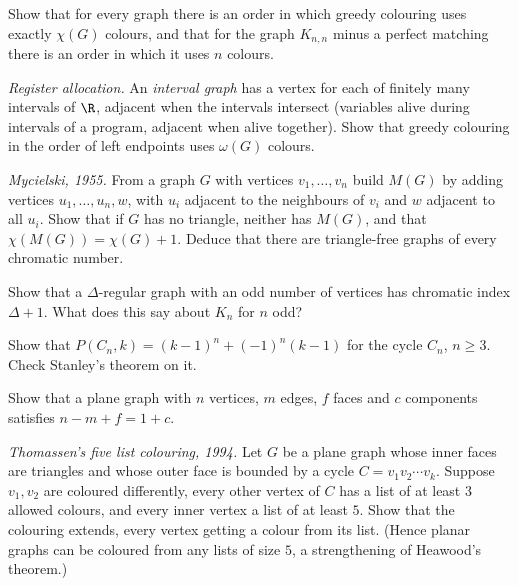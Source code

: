 \begin{exercise}[$\star$]\label{ex:greedyorder}
Show that for every graph there is an order in which greedy colouring uses exactly $\chi(G)$ colours, and that for the graph $K_{n,n}$ minus a perfect matching
there is an order in which it uses $n$ colours.
\end{exercise}

\begin{exercise}[$\star$]\label{ex:interval}
\emph{Register allocation.} An \emph{interval graph} has a vertex for each of finitely many intervals of $\R$, adjacent when the intervals intersect (variables alive
during intervals of a program, adjacent when alive together). Show that greedy colouring in the order of left endpoints uses $\omega(G)$ colours.
\end{exercise}

\begin{exercise}[$\star\star$]\label{ex:mycielski}
\emph{Mycielski, 1955.} From a graph $G$ with vertices $v_1,\dots,v_n$ build $M(G)$ by adding vertices $u_1,\dots,u_n,w$, with $u_i$ adjacent to the neighbours of $v_i$ and $w$
adjacent to all $u_i$. Show that if $G$ has no triangle, neither has $M(G)$, and that $\chi(M(G))=\chi(G)+1$. Deduce that there are triangle-free graphs of every chromatic
number.
\end{exercise}

\begin{exercise}[$\star$]\label{ex:classtwo}
Show that a $\Delta$-regular graph with an odd number of vertices has chromatic index $\Delta+1$. What does this say about $K_n$ for $n$ odd?
\end{exercise}

\begin{exercise}[$\star$]\label{ex:chromcycle}
Show that $P(C_n,k)=(k-1)^n+(-1)^n(k-1)$ for the cycle $C_n$, $n\ge3$. Check Stanley's theorem on it.
\end{exercise}

\begin{exercise}[$\star$]\label{ex:eulerc}
Show that a plane graph with $n$ vertices, $m$ edges, $f$ faces and $c$ components satisfies $n-m+f=1+c$.
\end{exercise}

\begin{exercise}[$\star\star\star$]\label{ex:listfive}
\emph{Thomassen's five list colouring, 1994.} Let $G$ be a plane graph whose inner faces are triangles and whose outer face is bounded by a cycle $C=v_1v_2\cdots v_k$. Suppose
$v_1,v_2$ are coloured differently, every other vertex of $C$ has a list of at least $3$ allowed colours, and every inner vertex a list of at least $5$. Show that the colouring
extends, every vertex getting a colour from its list. (Hence planar graphs can be coloured from any lists of size $5$, a strengthening of Heawood's theorem.)
\end{exercise}

